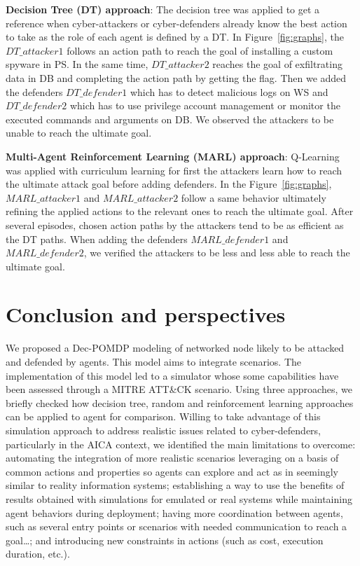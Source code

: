 \noindent
\textbf{Decision Tree (DT) approach}: \quad The decision tree was applied to get a reference when cyber-attackers or cyber-defenders already know the best action to take as the role of each agent is defined by a DT.
In Figure~\ref{fig:graphs}, the $DT\_attacker1$ follows an action path to reach the goal of installing a custom spyware in PS. In the same time, $DT\_attacker2$ reaches the goal of exfiltrating data in DB and completing the action path by getting the flag. Then we added the defenders $DT\_defender1$ which has to detect malicious logs on WS and $DT\_defender2$ which has to use privilege account management or monitor the executed commands and arguments on DB. We observed the attackers to be unable to reach the ultimate goal.

\noindent
\textbf{Multi-Agent Reinforcement Learning (MARL) approach}: \quad Q-Learning~\cite{CWatkins1992} was applied with curriculum learning for first the attackers learn how to reach the ultimate attack goal before adding defenders.
In the Figure~\ref{fig:graphs}, $MARL\_attacker1$ and $MARL\_attacker2$ follow a same behavior ultimately refining the applied actions to the relevant ones to reach the ultimate goal. After several episodes, chosen action paths by the attackers tend to be as efficient as the DT paths. When adding the defenders $MARL\_defender1$ and $MARL\_defender2$, we verified the attackers to be less and less able to reach the ultimate goal.


\section{Conclusion and perspectives}

\noindent
We proposed a Dec-POMDP modeling of networked node likely to be attacked and defended by agents. This model aims to integrate scenarios. The implementation of this model led to a simulator whose some capabilities have been assessed through a MITRE ATT\&CK scenario. Using three approaches, we briefly checked how decision tree, random and reinforcement learning approaches can be applied to agent for comparison.
Willing to take advantage of this simulation approach to address realistic issues related to cyber-defenders, particularly in the AICA context, we identified the main limitations to overcome:
automating the integration of more realistic scenarios leveraging on a basis of common actions and properties so agents can explore and act as in seemingly similar to reality information systems;
establishing a way to use the benefits of results obtained with simulations for emulated or real systems while maintaining agent behaviors during deployment;
having more coordination between agents, such as several entry points or scenarios with needed communication to reach a goal\dots;
and introducing new constraints in actions (such as cost, execution duration, etc.).
